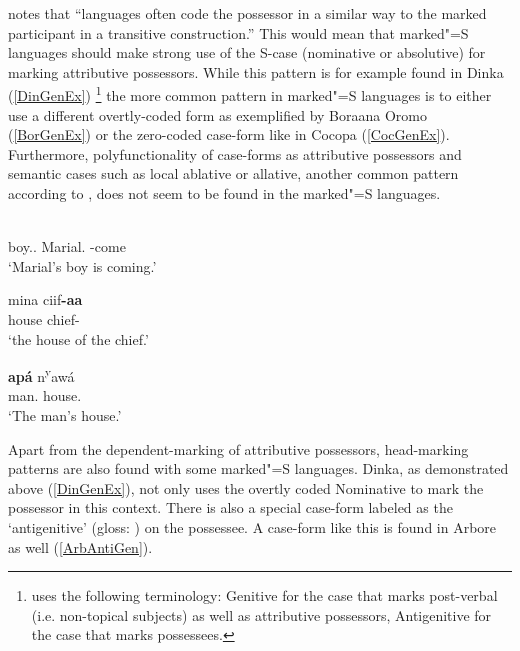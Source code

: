 \citet[590]{Lander:2009} notes that ``languages often code the possessor in a similar way to the marked participant in a transitive construction.''
This would mean that marked"=S languages should make strong use of the S-case (nominative or ab\-so\-lu\-tive) for marking attributive possessors.
While this pattern is for example found in Dinka (\ref{DinGenEx})
\footnote{\citet{Andersen:1991} uses the following terminology: Genitive for the case that marks post-verbal (i.e. non-topical subjects) as well as attributive possessors, Antigenitive for the case that marks possessees.}
 the more common pattern in marked"=S languages is to either use a different overtly-coded form as exemplified by Boraana Oromo (\ref{BorGenEx}) or the zero-coded case-form like in Cocopa (\ref{CocGenEx}). 
Furthermore, polyfunctionality of case-forms as attributive possessors and semantic cases such as local ablative or allative, another common pattern according to \citet[590]{Lander:2009},  does not seem to be found in the marked"=S languages.  

\begin{exe} 
\ex\label{DinGenEx}
\gll{}  \textbf{} \\
boy.\antgen{}.\acc{} \partic{} Marial.\nom{} \decl{}-come\\
\glt `Marial's boy is coming.'
\end{exe}

\begin{exe}
\ex\label{BorGenEx}
\gll mina ciif\textbf{-aa}\\
house chief-\gen{}\\
\glt `the house of the chief.'
\end{exe} 

\begin{exe}\ex\label{CocGenEx}
\gll\textbf{ ap\'a} n\textsuperscript{y}aw\'a\\
man.\acc{} house.\acc{}\\
\glt `The man's house.'
\end{exe}


Apart from the dependent-marking of attributive possessors, head-marking patterns are also found with some marked"=S languages.
Dinka, as demonstrated above (\ref{DinGenEx}), not only uses the overtly coded Nominative  to mark the possessor in this context. 
There is also a special case-form labeled as the `antigenitive' (gloss: \antgen{}) on the possessee. 
A case-form like this is found in Arbore as well (\ref{ArbAntiGen}).

